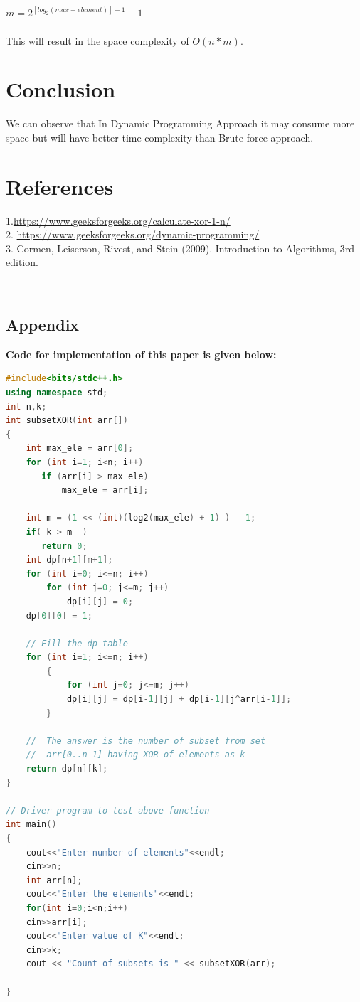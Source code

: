 \documentclass[conference]{IEEEtran}
\begin{document}
\quad $m=2^{[log_2(max-element)] + 1}-1$\\\\
This will result in the space complexity of $O(n*m)$. 


\section{Conclusion}
We can observe that In Dynamic Programming Approach it may consume more space but will have better time-complexity than Brute force approach.

 \section{References}
\color{blue}1.{\url{https://www.geeksforgeeks.org/calculate-xor-1-n/} }\\
2. {\url{https://www.geeksforgeeks.org/dynamic-programming/}}\\
3. Cormen, Leiserson, Rivest, and Stein (2009). Introduction to Algorithms, 3rd edition.

\color{black}
\
\begin{titlepage}
    \begin{center}
        \Huge
        \section*{Appendix}
        \end{center}
         \textbf{Code for implementation of this paper is given below:}
\begin{lstlisting}[language=C++,caption=Code for this paper]
#include<bits/stdc++.h>
using namespace std;
int n,k;
int subsetXOR(int arr[])
{
    int max_ele = arr[0];
    for (int i=1; i<n; i++)
       if (arr[i] > max_ele)
           max_ele = arr[i];
 
    int m = (1 << (int)(log2(max_ele) + 1) ) - 1;
    if( k > m  )
       return 0;
    int dp[n+1][m+1];
    for (int i=0; i<=n; i++)
        for (int j=0; j<=m; j++)
            dp[i][j] = 0;
    dp[0][0] = 1;
 
    // Fill the dp table
    for (int i=1; i<=n; i++)
        {
            for (int j=0; j<=m; j++)
            dp[i][j] = dp[i-1][j] + dp[i-1][j^arr[i-1]];
        }
 
    //  The answer is the number of subset from set
    //  arr[0..n-1] having XOR of elements as k
    return dp[n][k];
}
 
// Driver program to test above function
int main()
{
    cout<<"Enter number of elements"<<endl;
    cin>>n;
    int arr[n];
    cout<<"Enter the elements"<<endl;
    for(int i=0;i<n;i++)
    cin>>arr[i];
    cout<<"Enter value of K"<<endl;
    cin>>k;
    cout << "Count of subsets is " << subsetXOR(arr);
    
}
   
\end{lstlisting}
\end{titlepage}
\end{document}
